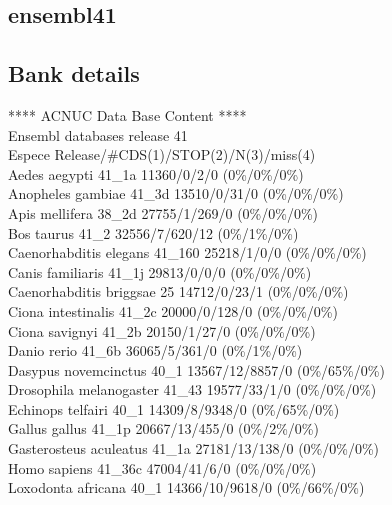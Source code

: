 \documentclass{article}
\begin{document}
\begin{Schunk}
\section{ ensembl41 }
\subsection{Bank details}
            ****     ACNUC Data Base Content      ****   \\
                 Ensembl databases release 41        \\
Espece                                  Release/\#CDS(1)/STOP(2)/N(3)/miss(4)\\
Aedes aegypti                           41\_1a 11360/0/2/0 (0\%/0\%/0\%)\\
Anopheles gambiae                       41\_3d 13510/0/31/0 (0\%/0\%/0\%)\\
Apis mellifera                          38\_2d 27755/1/269/0 (0\%/0\%/0\%)\\
Bos taurus                              41\_2 32556/7/620/12 (0\%/1\%/0\%)\\
Caenorhabditis elegans                  41\_160 25218/1/0/0 (0\%/0\%/0\%)\\
Canis familiaris                        41\_1j 29813/0/0/0 (0\%/0\%/0\%)\\
Caenorhabditis briggsae                 25 14712/0/23/1 (0\%/0\%/0\%)\\
Ciona intestinalis                      41\_2c 20000/0/128/0 (0\%/0\%/0\%)\\
Ciona savignyi                          41\_2b 20150/1/27/0 (0\%/0\%/0\%)\\
Danio rerio                             41\_6b 36065/5/361/0 (0\%/1\%/0\%)\\
Dasypus novemcinctus                    40\_1 13567/12/8857/0 (0\%/65\%/0\%)\\
Drosophila melanogaster                 41\_43 19577/33/1/0 (0\%/0\%/0\%)\\
Echinops telfairi                       40\_1 14309/8/9348/0 (0\%/65\%/0\%)\\
Gallus gallus                           41\_1p 20667/13/455/0 (0\%/2\%/0\%)\\
Gasterosteus aculeatus                  41\_1a 27181/13/138/0 (0\%/0\%/0\%)\\
Homo sapiens                            41\_36c 47004/41/6/0 (0\%/0\%/0\%)\\
Loxodonta africana                      40\_1 14366/10/9618/0 (0\%/66\%/0\%)\\

\end{Schunk}
\end{document}
